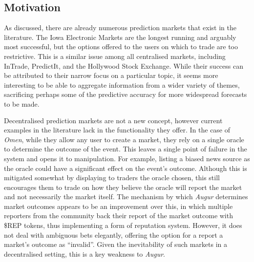 \subsection{Motivation}

As discussed, there are already numerous prediction markets that exist in the
literature. The Iowa Electronic Markets are the longest running and arguably
most successful, but the options offered to the users on which to trade are too
restrictive. This is a similar issue among all centralised markets, including
InTrade, PredictIt, and the Hollywood Stock Exchange. While their success can
be attributed to their narrow focus on a particular topic, it seems more
interesting to be able to aggregate information from a wider variety of themes,
sacrificing perhaps some of the predictive accuracy for more widespread
forecasts to be made.

Decentralised prediction markets are not a new concept, however current
examples in the literature lack in the functionality they offer. In the case of
\emph{Omen}, while they allow any user to create a market, they rely on a
single oracle to determine the outcome of the event. This leaves a single point
of failure in the system and opens it to manipulation. For example, listing a
biased news source as the oracle could have a significant effect on the event's
outcome. Although this is mitigated somewhat by displaying to traders the
oracle chosen, this still encourages them to trade on how they believe the
oracle will report the market and not necessarily the market itself. The
mechanism by which \emph{Augur} determines market outcomes appears to be an
improvement over this, in which multiple reporters from the community back
their report of the market outcome with \$REP tokens, thus implementing a form
of reputation system. However, it does not deal with ambiguous bets elegantly,
offering the option for a report a market's outcome as ``invalid''.  Given the
inevitability of such markets in a decentralised setting, this is a key
weakness to \emph{Augur}.

